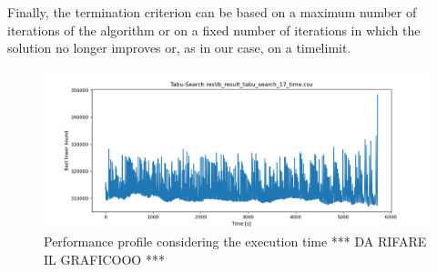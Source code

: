 Finally, the termination criterion can be based on a maximum number of iterations of the algorithm or on a fixed number of iterations in which the solution no longer improves or, as in our case, on a timelimit.

\begin{figure}[h]
	\centering
	\includegraphics[width=1.0\columnwidth]{../res/gr666_17.png}
	\caption{Performance profile considering the execution time *** DA RIFARE IL GRAFICOOO ***}
	\label{fig:tabu_search_perform_time}
\end{figure}
